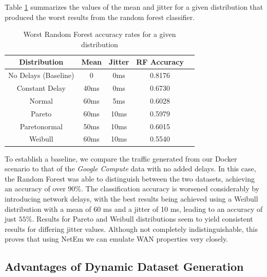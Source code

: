 \documentclass[sigconf]{acmart}
\begin{document}
Table \ref{tab:results-iat_rf} summarizes the values of the mean and jitter for a given distribution that produced the worst results from the random forest classifier.


\begin{table}[ht!]
\begin{center}
\begin{small}
\begin{sc}
\begin{tabular}{ccccc}
\hline
Distribution & Mean & Jitter & RF Accuracy\\
\hline
No Delays (Baseline) & 0 & 0ms & 0.8176 \\
Constant Delay & 40ms & 0ms & 0.6730 \\
Normal & 60ms & 5ms & 0.6028 \\
Pareto & 60ms & 10ms & 0.5979 \\
Paretonormal & 50ms & 10ms & 0.6015 \\
Weibull & 60ms & 10ms & 0.5540 \\
\hline
\end{tabular}
\end{sc}
\end{small}
\caption{Worst Random Forest accuracy rates for a given distribution}
\label{tab:results-iat_rf}
\end{center}
\vskip -4mm
\end{table}

To establish a baseline, we compare the traffic generated from our Docker scenario to that of the \textit{Google Compute} data with no added delays. In this case, the Random Forest was able to distinguish between the two datasets, achieving an accuracy of over 90\%. The classification accuracy is worsened considerably by introducing network delays, with the best results being achieved using a Weibull distribution with a mean of 60 ms and a jitter of 10 ms, leading to an accuracy of just $55\%$. Results for Pareto and Weibull distributions seem to yield consistent results for differing jitter values.
Although not completely indistinguishable, this proves that using NetEm we can emulate WAN properties very closely.

\subsection{Advantages of Dynamic Dataset Generation}
\end{document}
